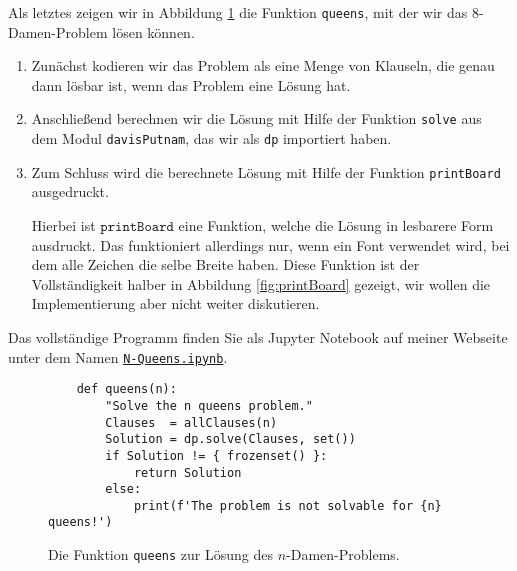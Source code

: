 Als letztes zeigen wir in Abbildung \ref{fig:solve:queens} die Funktion
\texttt{queens}, mit der wir das 8-Damen-Problem lösen können.
\begin{enumerate}
\item Zunächst kodieren wir das Problem als eine Menge von Klauseln, die genau dann lösbar ist,
      wenn das Problem eine Lösung hat.
\item Anschließend berechnen wir die Lösung mit Hilfe der Funktion \texttt{solve} aus dem Modul
      \texttt{davisPutnam}, das wir als \texttt{dp} importiert haben.
\item Zum Schluss wird die berechnete Lösung mit Hilfe der Funktion \texttt{printBoard} ausgedruckt.

      Hierbei ist $\texttt{printBoard}$ eine Funktion, welche die Lösung in lesbarere Form 
      ausdruckt.  Das funktioniert allerdings nur, wenn ein Font verwendet wird, bei dem alle Zeichen die
      selbe Breite haben.  Diese Funktion ist der Vollständigkeit halber in Abbildung \ref{fig:printBoard}
      gezeigt, wir wollen die Implementierung aber nicht weiter diskutieren.
\end{enumerate}
Das vollständige Programm finden Sie als Jupyter Notebook auf meiner Webseite unter dem Namen
\href{https://github.com/karlstroetmann/Logic/blob/master/Python/N-Queens.ipynb}{\texttt{N-Queens.ipynb}}.


\begin{figure}[!ht]
\centering
\begin{verbatim}
    def queens(n):
        "Solve the n queens problem."
        Clauses  = allClauses(n)
        Solution = dp.solve(Clauses, set())
        if Solution != { frozenset() }:
            return Solution
        else:
            print(f'The problem is not solvable for {n} queens!')
\end{verbatim}
\vspace*{-0.3cm}
\caption{Die Funktion \texttt{queens} zur Lösung des $n$-Damen-Problems.}
\label{fig:solve:queens}
\end{figure}



